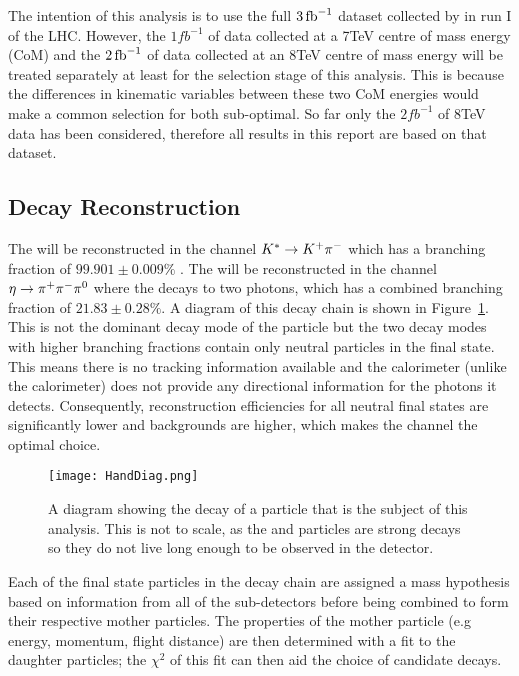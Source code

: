 The intention of this analysis is to use the full $3\mbox{\,fb}^{-1}$ dataset collected by \lhcb in run I of the LHC.  However, the $1fb^{-1}$ of data collected at a 7TeV centre of mass energy (CoM) and the $2\mbox{\,fb}^{-1}$ of data collected at an 8TeV centre of mass energy will be treated separately at least for the selection stage of this analysis.  This is because the differences in kinematic variables between these two CoM energies would make a common selection for both sub-optimal. So far only the $2fb^{-1}$ of 8TeV data has been considered, therefore all results in this report are based on that dataset.

\subsection{Decay Reconstruction}
\label{sec:Decay Reconstruction}
The \Kstar will be reconstructed in the channel ${{K}^*} \rightarrow {\ensuremath{{K}^+}}{\ensuremath{{\pi}^-}}$ which has a branching fraction of $99.901\pm0.009\%$ \cite{PDG2014}.  The \etaz will be reconstructed in the channel $\eta \rightarrow {\ensuremath{{\pi}^+}}{\ensuremath{{\pi}^-}}{\ensuremath{{\pi}^0}}$ where the \piz decays to two photons, which has a combined branching fraction of $21.83\pm0.28\%$\cite{PDG2014}.  A diagram of this decay chain is shown in Figure~\ref{fig:decay}.  This is not the dominant decay mode of the \etaz particle but the two decay modes with higher branching fractions contain only neutral particles in the final state.  This means there is no tracking information available and the \lhcb calorimeter (unlike the \atlas calorimeter) does not provide any directional information for the photons it detects.  Consequently, reconstruction efficiencies for all neutral final states are significantly lower and backgrounds are higher, which makes the \pip\pim\piz channel the optimal choice.
\begin{figure}
  \centering
  \texttt{[image: HandDiag.png]}
  \caption{A diagram showing the decay of a \Bd particle that is the subject of this analysis.  This is not to scale, as the \etaz and \Kstar particles are strong decays so they do not live long enough to be observed in the detector.}
  \label{fig:decay}
\end{figure}

Each of the final state particles in the decay chain are assigned a mass hypothesis based on information from all of the \lhcb sub-detectors before being combined to form their respective mother particles.  The properties of the mother particle (e.g energy, momentum, flight distance) are then determined with a fit to the daughter particles;   the $\chi^2$ of this fit can then aid the choice of candidate decays.

